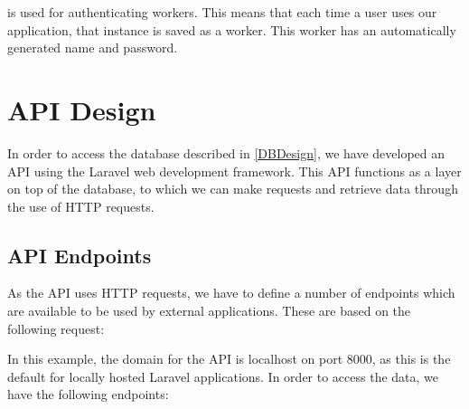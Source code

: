  is used for authenticating workers. This means that each time a
user uses our application, that instance is saved as a worker. This worker has
an automatically generated name and password.

\section{\acs{API} Design}
In order to access the database described in \autoref{DBDesign}, we have
developed an \ac{API} using the Laravel web development framework. This \ac{API} functions
as a layer on top of the database, to which we can make requests and retrieve
data through the use of \ac{HTTP} requests.

\subsection{\ac{API} Endpoints}
As the \ac{API} uses \ac{HTTP} requests, we have to define a number of
endpoints which are available to be used by external applications. These are based on the following
request:\nl

\nl

In this example, the domain for the \ac{API} is localhost on port 8000, as this is
the default for locally hosted Laravel applications. In order to access the
data, we have the following endpoints:

